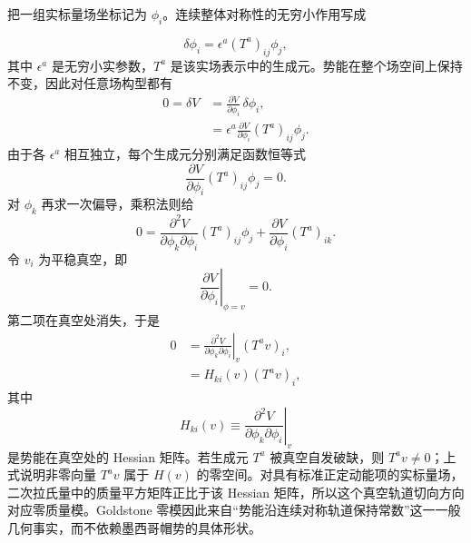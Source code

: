 \begin{derivation}
把一组实标量场坐标记为 $\phi_i$。连续整体对称性的无穷小作用写成

\begin{equation*}
 \delta\phi_i=\epsilon^a(T^a)_{ij}\phi_j,
\end{equation*}
其中 $\epsilon^a$ 是无穷小实参数，$T^a$ 是该实场表示中的生成元。势能在整个场空间上保持不变，因此对任意场构型都有
\begin{align*}
 0=\delta V
 &=\frac{\partial V}{\partial\phi_i}\,\delta\phi_i,\\
 &=\epsilon^a\frac{\partial V}{\partial\phi_i}(T^a)_{ij}\phi_j.
\end{align*}
由于各 $\epsilon^a$ 相互独立，每个生成元分别满足函数恒等式
\begin{equation*}
 \frac{\partial V}{\partial\phi_i}(T^a)_{ij}\phi_j=0.
\end{equation*}
对 $\phi_k$ 再求一次偏导，乘积法则给
\begin{equation*}
 0=
 \frac{\partial^2V}{\partial\phi_k\partial\phi_i}
 (T^a)_{ij}\phi_j
 +\frac{\partial V}{\partial\phi_i}(T^a)_{ik}.
\end{equation*}
令 $v_i$ 为平稳真空，即
\begin{equation*}
 \left.\frac{\partial V}{\partial\phi_i}\right|_{\phi=v}=0.
\end{equation*}
第二项在真空处消失，于是
\begin{align*}
 0
 &=\left.\frac{\partial^2V}{\partial\phi_k\partial\phi_i}
 \right|_{v}(T^av)_i,\\
 &=H_{ki}(v)(T^av)_i,
\end{align*}
其中
\begin{equation*}
 H_{ki}(v)\equiv
 \left.\frac{\partial^2V}{\partial\phi_k\partial\phi_i}\right|_v
\end{equation*}
是势能在真空处的 Hessian 矩阵。若生成元 $T^a$ 被真空自发破缺，则 $T^av\neq0$；上式说明非零向量 $T^av$ 属于 $H(v)$ 的零空间。对具有标准正定动能项的实标量场，二次拉氏量中的质量平方矩阵正比于该 Hessian 矩阵，所以这个真空轨道切向方向对应零质量模。Goldstone 零模因此来自“势能沿连续对称轨道保持常数”这一一般几何事实，而不依赖墨西哥帽势的具体形状。
\end{derivation}

